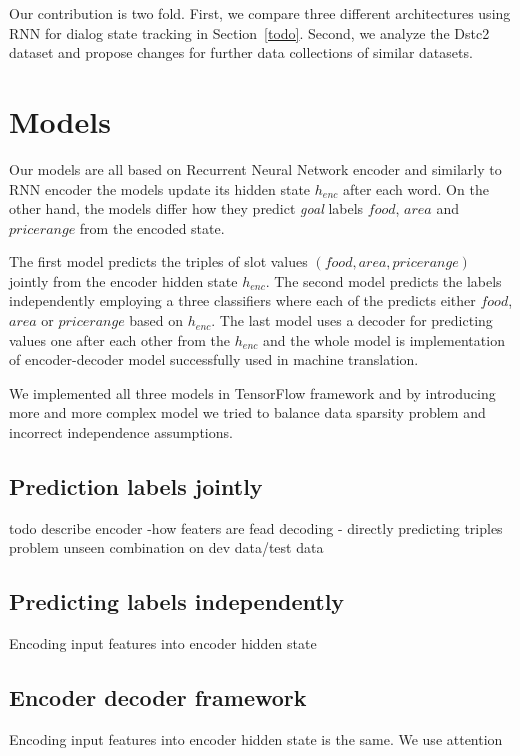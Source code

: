 \documentclass{itatnew}
\begin{document}
Our contribution is two fold. 
First, we compare three different architectures using RNN for dialog state tracking in Section~\ref{todo}.
Second, we analyze the Dstc2 dataset and propose changes for further data collections of similar datasets.


\section{Models}

Our models are all based on Recurrent Neural Network encoder\cite{todo} and similarly to RNN encoder\cite{Lukas} the models update its hidden state $h_{enc}$ after each word.
On the other hand, the models differ how they predict {\it goal} labels $food$, $area$ and $price range$ from the encoded state.

The first model predicts the triples of slot values $(food, area, price range)$ jointly from the encoder hidden state $h_{enc}$.
The second model predicts the labels independently employing a three classifiers where each of the predicts either $food$, $area$ or $price range$ based on $h_{enc}$. 
The last model uses a decoder for predicting values one after each other from the $h_{enc}$ and the whole model is implementation of encoder-decoder model successfully used in machine translation\cite{bahdanou}.

We implemented all three models in TensorFlow\cite{tensorflow} framework and by introducing more and more complex model we tried to balance data sparsity problem and incorrect independence assumptions.

\subsection{Prediction labels jointly}
todo describe encoder -how featers are fead
decoding - directly predicting triples
problem unseen combination on dev data/test data

\subsection{Predicting labels independently}
Encoding input features into encoder hidden state  

\subsection{Encoder decoder framework}
Encoding input features into encoder hidden state is the same.
We use attention
\end{document}
